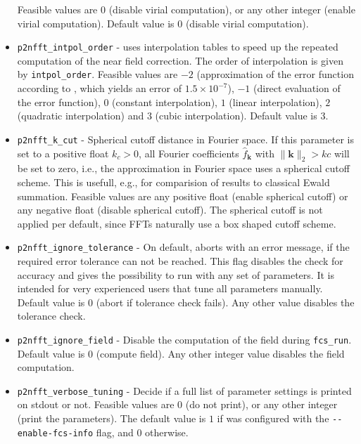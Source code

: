 \begin{itemize}
    Feasible values are $0$ (disable virial computation), or any other integer (enable virial computation).
    Default value is $0$ (disable virial computation).
  \item \verb!p2nfft_intpol_order! -
    \ptwonfft uses interpolation tables to speed up the repeated computation of the near field correction. The order of interpolation is given by \verb!intpol_order!.
    Feasible values are $-2$ (approximation of the error function according to \cite[eq.~(7.1.26)]{AbSt72}, which yields an error of $1.5\times 10^{-7}$),
    $-1$ (direct evaluation of the error function), $0$ (constant interpolation), $1$ (linear interpolation), $2$ (quadratic interpolation) and $3$ (cubic interpolation).
    Default value is $3$.
  \item \verb!p2nfft_k_cut! -
    Spherical cutoff distance in Fourier space. If this parameter is set to a positive float $k_c>0$, all Fourier coefficients $\hat f_{\mathbf k}$ with
    $\|\mathbf k\|_2 > kc$ will be set to zero, i.e., the approximation in Fourier space uses a spherical cutoff scheme.
    This is usefull, e.g., for comparision of results to classical Ewald summation.
    Feasible values are any positive float (enable spherical cutoff) or any negative float (disable spherical cutoff).
    The spherical cutoff is not applied per default, since FFTs naturally use a box shaped cutoff scheme.
  \item \verb!p2nfft_ignore_tolerance! -
    On default, \ptwonfft aborts with an error message, if the required error tolerance can not be reached.
    This flag disables the check for accuracy and gives the possibility to run \ptwonfft
    with any set of parameters. It is intended for very experienced users that tune all parameters manually.
    Default value is $0$ (abort if tolerance check fails). Any other value disables the tolerance check.
  \item \verb!p2nfft_ignore_field! -
    Disable the computation of the field during \verb!fcs_run!.
    Default value is $0$ (compute field). Any other integer value disables the field computation.
  \item \verb!p2nfft_verbose_tuning! -
    Decide if a full list of \ptwonfft parameter settings is printed on stdout or not.
    Feasible values are $0$ (do not print), or any other integer (print the parameters).
    The default value is $1$ if \project was configured with the \verb+--enable-fcs-info+ flag, and $0$ otherwise.
\end{itemize}

